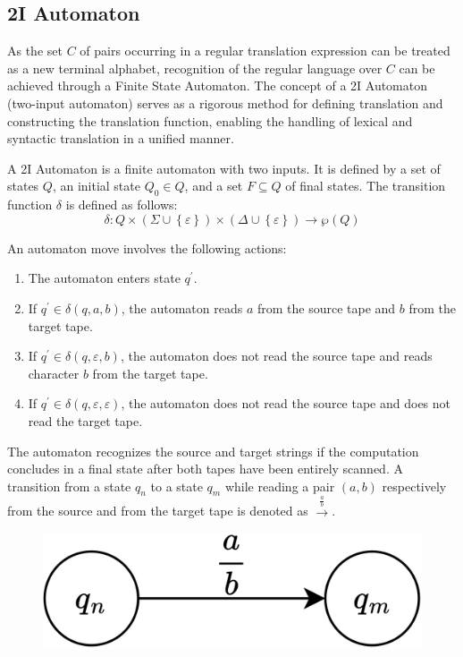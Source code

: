 \subsection{2I Automaton}
As the set $C$ of pairs occurring in a regular translation expression can be treated as a new terminal alphabet, recognition of the regular language over $C$ can be achieved through a Finite State Automaton.
The concept of a 2I Automaton (two-input automaton) serves as a rigorous method for defining translation and constructing the translation function, enabling the handling of lexical and syntactic translation in a unified manner.
\begin{definition}[2I Automaton]
    A 2I Automaton is a finite automaton with two inputs.
    It is defined by a set of states $Q$, an initial state $Q_0 \in Q$, and a set $F \subseteq Q$ of final states. 
    The transition function $\delta$ is defined as follows:
    \[ \delta : Q \times \left( \Sigma \cup \left\{ \varepsilon \right\} \right) \times \left( \Delta \cup \left\{ \varepsilon \right\} \right) \rightarrow \wp (Q) \]
\end{definition}
An automaton move involves the following actions:
\begin{enumerate}
    \item The automaton enters state $q^{'}$.
    \item If $q^{'} \in \delta(q, a, b)$, the automaton reads $a$ from the source tape and $b$ from the target tape. 
    \item If $q^{'} \in \delta(q, \varepsilon, b)$, the automaton does not read the source tape and reads character $b$ from the target tape. 
    \item If $q^{'} \in \delta(q, \varepsilon,\varepsilon)$, the automaton does not read the source tape and does not read the target tape. 
\end{enumerate}
The automaton recognizes the source and target strings if the computation concludes in a final state after both tapes have been entirely scanned. 
A transition from a state $q_n$ to a state $q_m$ while reading a pair $\left( a, b \right)$ respectively from the source and from the target tape is denoted as $\xrightarrow{\frac{a}{b}}$.
\begin{figure}[H]
  \centering
  \includegraphics[width=0.25\linewidth]{images/2i.png}
\end{figure}

